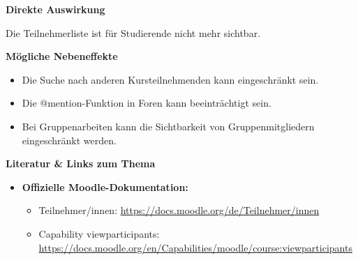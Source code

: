 \documentclass{article}
\newlength{\commonwidth}
\begin{document}
\textbf{Direkte Auswirkung}

Die Teilnehmerliste ist für Studierende nicht mehr sichtbar.

\vspace{0.3cm}

\textbf{Mögliche Nebeneffekte}

\begin{itemize}
  \item Die Suche nach anderen Kursteilnehmenden kann eingeschränkt sein.
  \item Die @mention-Funktion in Foren kann beeinträchtigt sein.
  \item Bei Gruppenarbeiten kann die Sichtbarkeit von Gruppenmitgliedern eingeschränkt werden.
\end{itemize}

\vspace{0.7cm}

\begin{center}
\begin{minipage}{\commonwidth}
\begin{mdframed}[
    backgroundcolor=lightgray, 
    linewidth=0pt, 
    roundcorner=5pt,
    innerleftmargin=1em,
    innerrightmargin=1em,
    innertopmargin=0.7em,
    innerbottommargin=0.7em
]
\raggedright
\textbf{\textcolor{customred}{Literatur \& Links zum Thema}}
\vspace{0.2cm}

\begin{itemize}
\item \textbf{Offizielle Moodle-Dokumentation:}
\vspace{0.2cm}
  \begin{itemize}
  \item Teilnehmer/innen: \url{https://docs.moodle.org/de/Teilnehmer/innen}
  \item Capability viewparticipants: \url{https://docs.moodle.org/en/Capabilities/moodle/course:viewparticipants}
  \end{itemize}
\vspace{0.5cm}
\end{itemize}
\end{mdframed}
\end{minipage}
\end{center}
\end{document}
